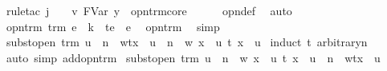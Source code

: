 \begin{isabellebody}
\ {\isacharparenleft}rule{\isacharunderscore}tac\ j\ {\isacharequal}\ {}\ \ v{\isacharequal}\ {\isachardoublequoteopen}FVar\ y{\isachardoublequoteclose}\ \ opn{\isacharunderscore}trm{\isacharunderscore}core{\isacharparenright}\isanewline
\ \ \isamarkupfalse%
\ {\isachardoublequoteopen}{}{\isachardoublequoteclose}{\isacharparenleft}{}{\isacharparenright}\ {\isachardoublequoteopen}{}{\isachardoublequoteclose}\ opn{\isacharprime}{\isacharunderscore}def\ \isamarkupfalse%
\ auto\isanewline
{}\isamarkupfalse%
%
\endisatagproof
{\isafoldproof}%
%
\isadelimproof
\isanewline
%
\endisadelimproof
\isanewline
{}\isamarkupfalse%
\ opn{\isacharunderscore}trm{}{\isacharcolon}\ {\isachardoublequoteopen}trm\ e\ {\isasymLongrightarrow}\ {\isacharbraceleft}k\ {\isasymrightarrow}\ t{\isacharbraceright}e\ {\isacharequal}\ e{\isachardoublequoteclose}\ \isanewline
%
\isadelimproof
%
\endisadelimproof
%
\isatagproof
{}\isamarkupfalse%
\ opn{\isacharunderscore}trm\ \isamarkupfalse%
\ simp%
\endisatagproof
{\isafoldproof}%
%
\isadelimproof
\isanewline
%
\endisadelimproof
\isanewline
{}\isamarkupfalse%
\ subst{\isacharunderscore}open{\isacharcolon}\ {\isachardoublequoteopen}trm\ u\ {\isasymLongrightarrow}\ {\isacharparenleft}{\isacharbraceleft}n\ {\isasymrightarrow}\ w{\isacharbraceright}t{\isacharparenright}{\isacharbrackleft}x\ {\isacharcolon}{\isacharcolon}{\isacharequal}\ u{\isacharbrackright}\ {\isacharequal}\ {\isacharbraceleft}n\ {\isasymrightarrow}\ w\ {\isacharbrackleft}x\ {\isacharcolon}{\isacharcolon}{\isacharequal}\ u{\isacharbrackright}{\isacharbraceright}\ {\isacharparenleft}t\ {\isacharbrackleft}x\ {\isacharcolon}{\isacharcolon}{\isacharequal}\ u{\isacharbrackright}{\isacharparenright}{\isachardoublequoteclose}\isanewline
%
\isadelimproof
%
\endisadelimproof
%
\isatagproof
{}\isamarkupfalse%
\ {\isacharparenleft}induct\ t\ arbitrary{\isacharcolon}n{\isacharparenright}\isanewline
{}\isamarkupfalse%
\ {\isacharparenleft}auto\ simp\ add{\isacharcolon}opn{\isacharunderscore}trm{\isacharparenright}%
\endisatagproof
{\isafoldproof}%
%
\isadelimproof
\isanewline
%
\endisadelimproof
\isanewline
{}\isamarkupfalse%
\ subst{\isacharunderscore}open{}{\isacharcolon}\ {\isachardoublequoteopen}trm\ u\ {\isasymLongrightarrow}\ {\isacharbraceleft}n\ {\isasymrightarrow}\ w\ {\isacharbrackleft}x\ {\isacharcolon}{\isacharcolon}{\isacharequal}\ u{\isacharbrackright}{\isacharbraceright}\ {\isacharparenleft}t\ {\isacharbrackleft}x\ {\isacharcolon}{\isacharcolon}{\isacharequal}\ u{\isacharbrackright}{\isacharparenright}\ {\isacharequal}\ {\isacharparenleft}{\isacharbraceleft}n\ {\isasymrightarrow}\ w{\isacharbraceright}t{\isacharparenright}{\isacharbrackleft}x\ {\isacharcolon}{\isacharcolon}{\isacharequal}\ u{\isacharbrackright}{\isachardoublequoteclose}\isanewline

\end{isabellebody}
